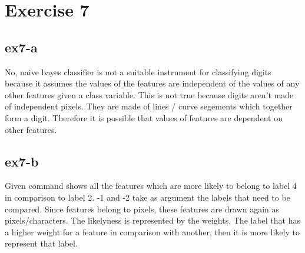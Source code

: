 \section{Exercise 7}
\subsection{ex7-a}
No, naive bayes classifier is not a suitable instrument for classifying digits because it assumes the values of the
features are independent of the values of any other features given a class variable. This is not true because digits
aren't made of independent pixels. They are made of lines / curve segements which together form a digit. Therefore it
is possible that values of features are dependent on other features.

\subsection{ex7-b}
Given command shows all the features which are more likely to belong to label 4 in comparison to label 2. -1 and -2 take
as argument the labels that need to be compared. Since features belong to pixels, these features are drawn again as
pixels/characters. The likelyness is represented by the weights. The label that has a higher weight for a feature in
comparison with another, then it is more likely to represent that label.

